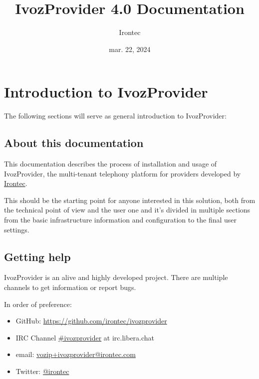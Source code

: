 \documentclass[letterpaper,10pt,spanish]{sphinxmanual}
\title{IvozProvider 4.0 Documentation}
\date{mar. 22, 2024}
\author{Irontec}
\begin{document}
\maketitle
\tableofcontents
{}\label{index::doc}



\chapter{Introduction to IvozProvider}
\label{basic_concepts/intro/index::doc}\label{basic_concepts/intro/index:introduction-to-ivozprovider}\label{basic_concepts/intro/index:ivozprovider-official-documentation}
The following sections will serve as general introduction to IvozProvider:


\section{About this documentation}
\label{basic_concepts/intro/about::doc}\label{basic_concepts/intro/about:about-this-documentation}
This documentation describes the process of installation and usage of
IvozProvider, the multi-tenant telephony platform for providers developed
by \href{http://irontec.com}{Irontec}.

This should be the starting point for anyone interested in this solution,
both from the technical point of view and the user one and it's divided
in multiple sections from the basic infrastructure information and configuration
to the final user settings.


\section{Getting help}
\label{basic_concepts/intro/getting_help:getting-help}\label{basic_concepts/intro/getting_help::doc}\label{basic_concepts/intro/getting_help:id1}
IvozProvider is an alive and highly developed project. There are
multiple channels to get information or report bugs.

In order of preference:
\begin{itemize}
\item {} 
GitHub: \url{https://github.com/irontec/ivozprovider}

\item {} 
IRC Channel \href{https://kiwiirc.com/nextclient/irc.libera.chat/\#ivozprovider}{\#ivozprovider} at irc.libera.chat

\item {} 
email: \href{mailto:vozip+ivozprovider@irontec.com}{vozip+ivozprovider@irontec.com}

\item {} 
Twitter: \href{https://twitter.com/irontec}{@irontec}

\end{itemize}
\end{document}
